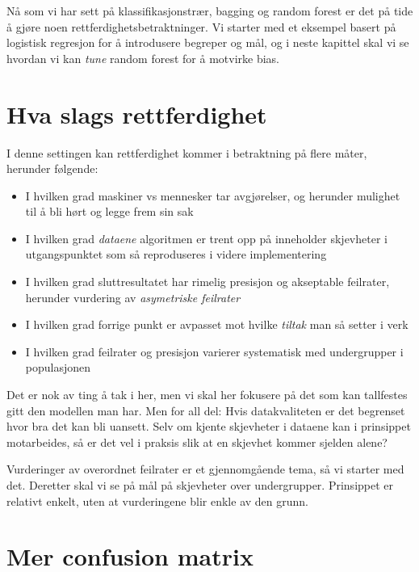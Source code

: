 \documentclass[
  letterpaper,
  DIV=11,
  numbers=noendperiod]{scrreprt}
\providecommand{\tightlist}{%
  \setlength{\itemsep}{0pt}\setlength{\parskip}{0pt}}
\begin{document}
Nå som vi har sett på klassifikasjonstrær, bagging og random forest er
det på tide å gjøre noen rettferdighetsbetraktninger. Vi starter med et
eksempel basert på logistisk regresjon for å introdusere begreper og
mål, og i neste kapittel skal vi se hvordan vi kan \emph{tune} random
forest for å motvirke bias.

\section{Hva slags rettferdighet}\label{hva-slags-rettferdighet}

I denne settingen kan rettferdighet kommer i betraktning på flere måter,
herunder følgende:

\begin{itemize}
\tightlist
\item
  I hvilken grad maskiner vs mennesker tar avgjørelser, og herunder
  mulighet til å bli hørt og legge frem sin sak
\item
  I hvilken grad \emph{dataene} algoritmen er trent opp på inneholder
  skjevheter i utgangspunktet som så reproduseres i videre
  implementering
\item
  I hvilken grad sluttresultatet har rimelig presisjon og akseptable
  feilrater, herunder vurdering av \emph{asymetriske feilrater}
\item
  I hvilken grad forrige punkt er avpasset mot hvilke \emph{tiltak} man
  så setter i verk
\item
  I hvilken grad feilrater og presisjon varierer systematisk med
  undergrupper i populasjonen
\end{itemize}

Det er nok av ting å tak i her, men vi skal her fokusere på det som kan
tallfestes gitt den modellen man har. Men for all del: Hvis
datakvaliteten er det begrenset hvor bra det kan bli uansett. Selv om
kjente skjevheter i dataene kan i prinsippet motarbeides, så er det vel
i praksis slik at en skjevhet kommer sjelden alene?

Vurderinger av overordnet feilrater er et gjennomgående tema, så vi
starter med det. Deretter skal vi se på mål på skjevheter over
undergrupper. Prinsippet er relativt enkelt, uten at vurderingene blir
enkle av den grunn.

\section{Mer confusion matrix}\label{mer-confusion-matrix}
\end{document}
